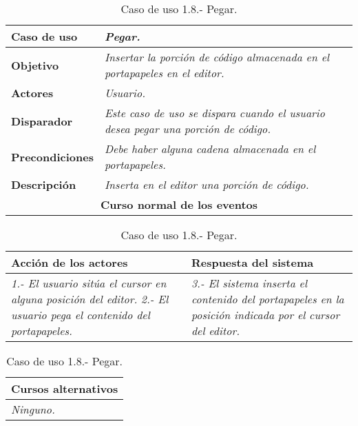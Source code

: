    \begin{table}[!ht] %
      \centering
      \begin{tabular}{|p{4cm}|p{11.5cm}|}
      \hline
      \textbf{Caso de uso} & \textit{Pegar.}\\ \hline
      \textbf{Objetivo} & \textit{Insertar la porción de código almacenada en el portapapeles en el editor.}\\ \hline
      \textbf{Actores} & \textit{Usuario.}\\ \hline
      \textbf{Disparador} & \textit{Este caso de uso se dispara cuando el usuario desea pegar una porción de código.}\\ \hline
      \textbf{Precondiciones} & \textit{Debe haber alguna cadena almacenada en el portapapeles.}\\ \hline
      \textbf{Descripción} & \textit{Inserta en el editor una porción de código.}\\ \hline
      \multicolumn{2}{|c|}{\textbf{Curso normal de los eventos}}\\ \hline
    \end{tabular}
    \begin{tabular}{|p{7.75cm}|p{7.75cm}|}
      \hspace{2cm}\textbf{Acción de los actores} & \hspace{1.75cm}\textbf{Respuesta del sistema}\\ \hline
      \textit{1.- El usuario sitúa el cursor en alguna posición del editor.} \textit{2.- El usuario pega el contenido del portapapeles.} &
                        \textit{3.- El sistema inserta el contenido del portapapeles en la posición indicada por el cursor del editor.} \\ \hline
    \end{tabular}
    \begin{tabular}{|p{15.9cm}|}
      \hspace{6cm}\textbf{Cursos alternativos}\\ \hline     
      \textit{Ninguno.} \\ \hline
    \end{tabular}
    \caption{Caso de uso 1.8.- Pegar.}
   \end{table}


